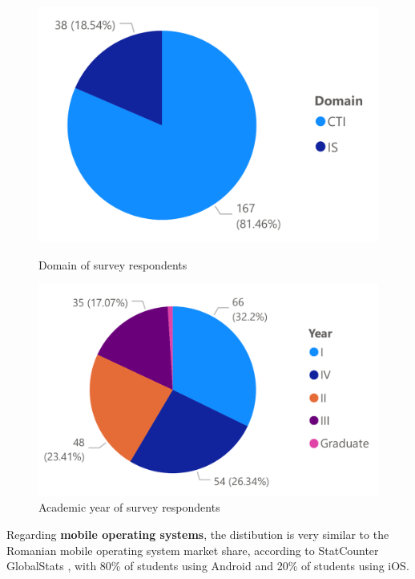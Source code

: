 \begin{figure}[!ht]
    \centering
    \begin{minipage}[b]{0.49\textwidth}
        \captionsetup{justification=centering}
         \includegraphics[height=0.2\textheight]{figures/charts/survey/domain.pdf}
        \caption{Domain of survey respondents}
        \label{3:fig:domain}
    \end{minipage}
    \hfill
    \begin{minipage}[b]{0.49\textwidth}
        \captionsetup{justification=centering}
         \includegraphics[height=0.2\textheight]{figures/charts/survey/year.pdf}
        \caption{Academic year of survey respondents}
        \label{3:fig:year}
    \end{minipage}
\end{figure}

Regarding \textbf{mobile operating systems}, the distibution is very similar to the Romanian mobile operating system market share, according to StatCounter GlobalStats \cite{statcounter2020mobile}, with 80\% of students using Android and 20\% of students using iOS.

